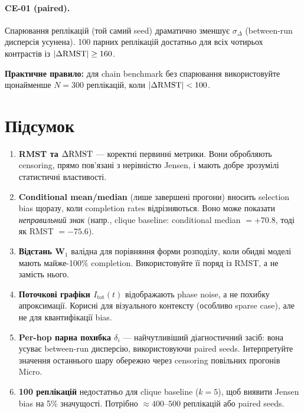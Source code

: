 \documentclass[11pt,a4paper]{article}
\begin{document}
\paragraph{CE-01 (paired).}
Спарювання реплікацій (той самий seed) драматично зменшує $\sigma_\Delta$
(between-run дисперсія усунена).  100 парних реплікацій достатньо
для всіх чотирьох контрастів із $|\Delta\mathrm{RMST}| \geq 160$.

\textbf{Практичне правило:} для chain benchmark без спарювання
використовуйте щонайменше $N = 300$ реплікацій, коли $|\Delta\mathrm{RMST}| < 100$.

\section{Підсумок}

\begin{enumerate}
  \item \textbf{RMST та $\Delta\mathrm{RMST}$} --- коректні первинні метрики.
        Вони обробляють censoring, прямо пов'язані з нерівністю Jensen,
        і мають добре зрозумілі статистичні властивості.

  \item \textbf{Conditional mean/median} (лише завершені прогони) вносить
        selection bias щоразу, коли completion rates відрізняються.  Воно може показати
        \emph{неправильний знак} (напр., clique baseline: conditional median $= +70.8$,
        тоді як RMST $= -75.6$).

  \item \textbf{Відстань W$_1$} валідна для порівняння форми розподілу,
        коли обидві моделі мають майже-100\% completion.  Використовуйте її поряд із RMST,
        а не замість нього.

  \item \textbf{Поточкові графіки $I_{\mathrm{tot}}(t)$} відображають phase noise,
        а не похибку апроксимації.  Корисні для візуального контексту (особливо
        sparse case), але не для квантифікації bias.

  \item \textbf{Per-hop парна похибка $\delta_i$} --- найчутливіший
        діагностичний засіб: вона усуває between-run дисперсію, використовуючи paired seeds.
        Інтерпретуйте значення останнього шару обережно через censoring
        повільних прогонів Micro.

  \item \textbf{100 реплікацій} недостатньо для clique baseline
        ($k=5$), щоб виявити Jensen bias на 5\% значущості.
        Потрібно $\approx 400$--$500$ реплікацій або paired seeds.
\end{enumerate}
\end{document}
